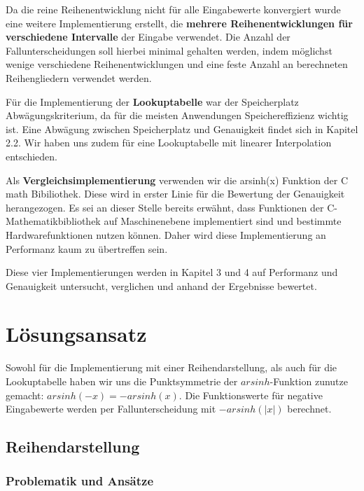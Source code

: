 \documentclass[course=erap] {aspdoc}
\begin{document}
    Da die reine Reihenentwicklung nicht für alle Eingabewerte konvergiert wurde eine weitere Implementierung erstellt, die \textbf{mehrere Reihenentwicklungen für verschiedene Intervalle} der Eingabe verwendet.
    Die Anzahl der Fallunterscheidungen soll hierbei minimal gehalten werden, indem möglichst wenige verschiedene Reihenentwicklungen und eine feste Anzahl an berechneten Reihengliedern verwendet werden.

    Für die Implementierung der \textbf{Lookuptabelle} war der Speicherplatz Abwägungskriterium, da für die meisten Anwendungen Speichereffizienz wichtig ist.
    Eine Abwägung zwischen Speicherplatz und Genauigkeit findet sich in Kapitel 2.2.
    Wir haben uns zudem für eine Lookuptabelle mit linearer Interpolation entschieden.

    Als \textbf{Vergleichsimplementierung} verwenden wir die arsinh(x) Funktion der C math Bibiliothek.
    Diese wird in erster Linie für die Bewertung der Genauigkeit herangezogen.
    Es sei an dieser Stelle bereits erwähnt, dass Funktionen der C-Mathematikbibliothek auf Maschinenebene implementiert sind und bestimmte Hardwarefunktionen nutzen können.
    Daher wird diese Implementierung an Performanz kaum zu übertreffen sein.

    Diese vier Implementierungen werden in Kapitel 3 und 4 auf Performanz und Genauigkeit untersucht, verglichen und anhand der Ergebnisse bewertet.


    \section{Lösungsansatz}

    Sowohl für die Implementierung mit einer Reihendarstellung, als auch für die Lookuptabelle haben wir uns die Punktsymmetrie der $arsinh$-Funktion zunutze gemacht: $arsinh(-x) = -arsinh(x)$.
    Die Funktionswerte für negative Eingabewerte werden per Fallunterscheidung mit $-arsinh(|x|)$ berechnet.

    \subsection{ Reihendarstellung}

    \subsubsection{Problematik und Ansätze}
\end{document}
